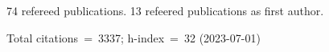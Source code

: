 74 refereed publications. 13 refeered publications as first author.

Total citations~=~3337; h-index~=~32 (2023-07-01)